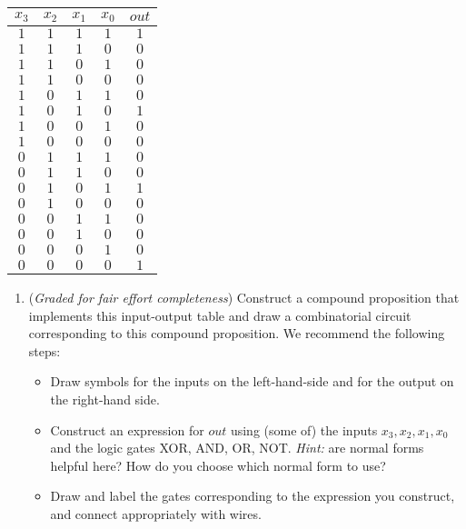 \documentclass[12pt, oneside]{article}
\begin{document}
\begin{enumerate}
   \begin{center}
   \begin{tabular}{cccc|c}
   $x_3$ & $x_2$ & $x_1$ & $x_0$ & $out$\\
   \hline
   $1$ & $1$ & $1$ & $1$ & $1$\\
   $1$ & $1$ & $1$ & $0$ & $0$\\
   $1$ & $1$ & $0$ & $1$ & $0$\\
   $1$ & $1$ & $0$ & $0$ & $0$\\
   $1$ & $0$ & $1$ & $1$ & $0$\\
   $1$ & $0$ & $1$ & $0$ & $1$\\
   $1$ & $0$ & $0$ & $1$ & $0$\\
   $1$ & $0$ & $0$ & $0$ & $0$\\
   $0$ & $1$ & $1$ & $1$ & $0$\\
   $0$ & $1$ & $1$ & $0$ & $0$\\
   $0$ & $1$ & $0$ & $1$ & $1$\\
   $0$ & $1$ & $0$ & $0$ & $0$\\
   $0$ & $0$ & $1$ & $1$ & $0$\\
   $0$ & $0$ & $1$ & $0$ & $0$\\
   $0$ & $0$ & $0$ & $1$ & $0$\\
   $0$ & $0$ & $0$ & $0$ & $1$\\
   \end{tabular}
   \end{center}
   \begin{enumerate}   
   \item  ({\it Graded for fair effort completeness}) 
   Construct a compound proposition that implements this input-output table
   and draw a combinatorial circuit corresponding to this compound proposition. We recommend
   the following steps:
   
   \begin{itemize}
   \item Draw symbols for the inputs on the left-hand-side and for the output on the right-hand side.
   \item Construct an expression for $out$ using (some of) the inputs 
   $x_3, x_2, x_1, x_0$ and the logic gates XOR, AND, OR, NOT. {\it Hint:} are normal forms helpful here?
   How do you choose which normal form to use?
   \item Draw and label the gates corresponding to the expression you construct, and connect appropriately with wires.
   \end{itemize}
   

\end{enumerate}
\end{enumerate}
\end{document}
